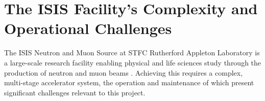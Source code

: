 \documentclass[10pt,oneside]{report}
\begin{document}


\section{The ISIS Facility's Complexity and Operational Challenges}\label{sec:isisbg}



The ISIS Neutron and Muon Source at STFC Rutherford Appleton Laboratory is a large-scale research facility enabling physical and life sciences study through the production of neutron and muon beams \cite{thomason2019isis}. Achieving this requires a complex, multi-stage accelerator system, the operation and maintenance of which present significant challenges relevant to this project.
\end{document}
